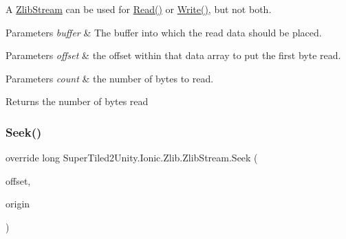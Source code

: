 A {\ttfamily \mbox{\hyperlink{class_super_tiled2_unity_1_1_ionic_1_1_zlib_1_1_zlib_stream}{Zlib\+Stream}}} can be used for {\ttfamily \mbox{\hyperlink{class_super_tiled2_unity_1_1_ionic_1_1_zlib_1_1_zlib_stream_a0987720c2d2c6219e1f1cbd9ae8ee818}{Read()}}} or {\ttfamily \mbox{\hyperlink{class_super_tiled2_unity_1_1_ionic_1_1_zlib_1_1_zlib_stream_a042abef8f9aa0d0043e6081d9de7dea7}{Write()}}}, but not both. 


\begin{DoxyParams}{Parameters}
{\em buffer} & The buffer into which the read data should be placed.\\
\hline
\end{DoxyParams}



\begin{DoxyParams}{Parameters}
{\em offset} & the offset within that data array to put the first byte read.\\
\hline
\end{DoxyParams}



\begin{DoxyParams}{Parameters}
{\em count} & the number of bytes to read.\\
\hline
\end{DoxyParams}


\begin{DoxyReturn}{Returns}
the number of bytes read
\end{DoxyReturn}
\mbox{\label{class_super_tiled2_unity_1_1_ionic_1_1_zlib_1_1_zlib_stream_aa82b389bedbd663d92b2c5aa4500b917}} 
\subsubsection{\texorpdfstring{Seek()}{Seek()}}
{\footnotesize\ttfamily override long Super\+Tiled2\+Unity.\+Ionic.\+Zlib.\+Zlib\+Stream.\+Seek (\begin{DoxyParamCaption}\item[{long}]{offset,  }\item[{System.\+I\+O.\+Seek\+Origin}]{origin }\end{DoxyParamCaption})}



